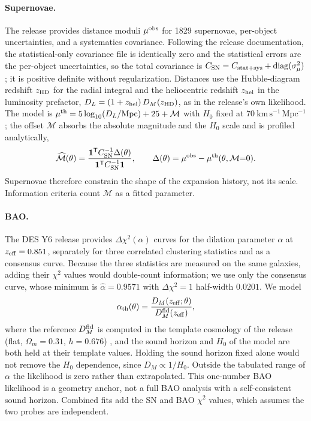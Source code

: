 \documentclass[11pt]{article}
\theoremstyle{plain}
\theoremstyle{definition}
\theoremstyle{remark}
\begin{document}
\paragraph{Supernovae.}
The release provides distance moduli $\mu^{\rm obs}$ for 1829 supernovae, per-object uncertainties, and a systematics covariance. Following the release documentation, the statistical-only covariance file is identically zero and the statistical errors are the per-object uncertainties, so the total covariance is $C_{\rm SN}=C_{\rm stat+sys}+\mathrm{diag}(\sigma_{\mu}^2)$; it is positive definite without regularization. Distances use the Hubble-diagram redshift $z_{\rm HD}$ for the radial integral and the heliocentric redshift $z_{\rm hel}$ in the luminosity prefactor, $D_L=(1+z_{\rm hel})\,D_M(z_{\rm HD})$, as in the release's own likelihood. The model is $\mu^{\rm th}=5\log_{10}(D_L/\mathrm{Mpc})+25+\mathcal M$ with $H_0$ fixed at $70\ \mathrm{km\,s^{-1}\,Mpc^{-1}}$; the offset $\mathcal M$ absorbs the absolute magnitude and the $H_0$ scale and is profiled analytically,
\begin{equation}
\widehat{\mathcal M}(\theta)=\frac{\mathbf 1^{\mathsf T}C_{\rm SN}^{-1}\Delta(\theta)}{\mathbf 1^{\mathsf T}C_{\rm SN}^{-1}\mathbf 1},\qquad \Delta(\theta)=\mu^{\rm obs}-\mu^{\rm th}(\theta,\mathcal M{=}0).
\label{eq:sn_Mhat}
\end{equation}
Supernovae therefore constrain the shape of the expansion history, not its scale. Information criteria count $\mathcal M$ as a fitted parameter.

\paragraph{BAO.}
The DES Y6 release provides $\Delta\chi^2(\alpha)$ curves for the dilation parameter $\alpha$ at $z_{\rm eff}=0.851$, separately for three correlated clustering statistics and as a consensus curve. Because the three statistics are measured on the same galaxies, adding their $\chi^2$ values would double-count information; we use only the consensus curve, whose minimum is $\hat\alpha=0.9571$ with $\Delta\chi^2=1$ half-width $0.0201$. We model
\begin{equation}
\alpha_{\rm th}(\theta)=\frac{D_M(z_{\rm eff};\theta)}{D_M^{\rm fid}(z_{\rm eff})},
\label{eq:alpha_th}
\end{equation}
where the reference $D_M^{\rm fid}$ is computed in the template cosmology of the release (flat, $\Omega_m=0.31$, $h=0.676$) \cite{DES2024Y6BAO}, and the sound horizon and $H_0$ of the model are both held at their template values. Holding the sound horizon fixed alone would not remove the $H_0$ dependence, since $D_M\propto1/H_0$. Outside the tabulated range of $\alpha$ the likelihood is zero rather than extrapolated. This one-number BAO likelihood is a geometry anchor, not a full BAO analysis with a self-consistent sound horizon. Combined fits add the SN and BAO $\chi^2$ values, which assumes the two probes are independent.
\end{document}
